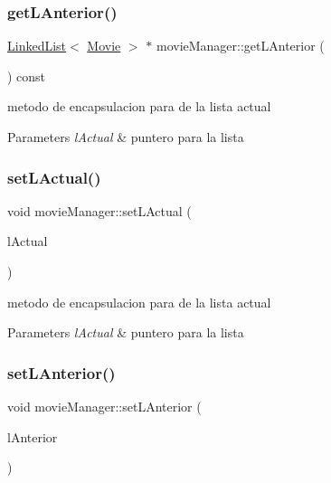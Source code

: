 \subsubsection{\texorpdfstring{get\+L\+Anterior()}{getLAnterior()}}
{\footnotesize\ttfamily \hyperlink{classLinkedList}{Linked\+List}$<$ \hyperlink{classMovie}{Movie} $>$ $\ast$ movie\+Manager\+::get\+L\+Anterior (\begin{DoxyParamCaption}{ }\end{DoxyParamCaption}) const}



metodo de encapsulacion para de la lista actual 


\begin{DoxyParams}{Parameters}
{\em l\+Actual} & puntero para la lista \\
\hline
\end{DoxyParams}
\mbox{\label{classmovieManager_a6a9aaf1eca1abe828713c2b12a00ab44}} 
\subsubsection{\texorpdfstring{set\+L\+Actual()}{setLActual()}}
{\footnotesize\ttfamily void movie\+Manager\+::set\+L\+Actual (\begin{DoxyParamCaption}\item[{\hyperlink{classLinkedList}{Linked\+List}$<$ \hyperlink{classMovie}{Movie} $>$ $\ast$}]{l\+Actual }\end{DoxyParamCaption})}



metodo de encapsulacion para de la lista actual 


\begin{DoxyParams}{Parameters}
{\em l\+Actual} & puntero para la lista \\
\hline
\end{DoxyParams}
\mbox{\label{classmovieManager_a1f35573336c4c9ae656917ed5deddc2d}} 
\subsubsection{\texorpdfstring{set\+L\+Anterior()}{setLAnterior()}}
{\footnotesize\ttfamily void movie\+Manager\+::set\+L\+Anterior (\begin{DoxyParamCaption}\item[{\hyperlink{classLinkedList}{Linked\+List}$<$ \hyperlink{classMovie}{Movie} $>$ $\ast$}]{l\+Anterior }\end{DoxyParamCaption})}



